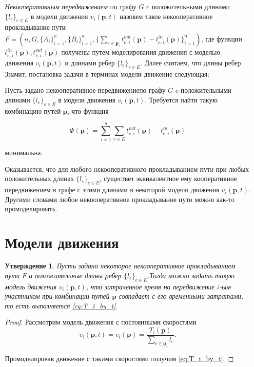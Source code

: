 \documentclass[12pt, a4paper]{article}
\newtheorem{state}{Утверждение}[section]
\begin{document}
\textit{Некооперативным передвижением} по графу $G$ c положительными длинами $\{l_e\}_{e \in E}$ в модели движения $v_i(\textbf{p}, t)$ назовем такое некооперативное прокладывание пути $F = (n, G, \{A_i\}_{i = 1}^{n}, \{B_i\}_{i = 1}^{n}, \{\sum_{e \in \textbf{p}_i} t_{e, i}^{out}(\textbf{p}) - t_{e, i}^{in}(\textbf{p})\}_{i = 1}^{n})$, где функции $t_{e, i}^{in}(\textbf{p}), t_{e, i}^{out}(\textbf{p})$ получены путем моделирования движения с моделью движения $v_i(\textbf{p}, t)$ и длинами ребер $\{l_e\}_{e \in E}$. Далее считаем, что длины ребер 
Значит, постановка задачи в терминах модели движение следующая:

Пусть задано некооперативное передвижениепо графу $G$ c положительными длинами $\{l_e\}_{e \in E}$ в модели движения $v_i(\textbf{p}, t)$.
Требуется найти такую комбинацию путей $\textbf{p}$, что функция 

\begin{equation}
\label{eq:target_task_end}
\Phi(\textbf{p}) =\sum \limits_{i = 1}^n \sum \limits_{e \in E} t_{e, i}^{out}(\textbf{p}) - t_{e, i}^{in}(\textbf{p})
\end{equation}

минимальна.

Оказывается, что для любого некооперативного прокладыванием пути при любых положительных длинах $\{l_e\}_{e \in E}$, существет эквивалентное ему кооперативное передвижением в графе с этими длинами в некоторой модели движения $v_i(\textbf{p}, t)$. Другими словами любое некооперативное прокладывание пути можно как-то промоделировать.

\newpage
\section{Модели движения}

\begin{state}
	\label{state:eqv}
	Пусть задано некоторое некооперативное прокладыванием пути $F$ и положительные длины ребер  $\{l_e\}_{e \in E}$.Тогда можно задать такую модель движения $v_i(\textbf{p}, t)$, что затраченное время на передвижение $i$-ым участником при комбинации путей $\textbf{p}$ совпадает с его временными затратами, то есть выполняется \eqref{eq:T_i_by_t}.
	
\end{state}

\begin{proof}
Рассмотрим модель движения с постоянными скоростями  
$$v_i(\textbf{p}, t) = \overline{v}_i(\textbf{p}) = \frac{T_i (\textbf{p})}{\sum \limits_{e \in \textbf{p}_i} l_e}.$$

Промоделировав движение с такими скоростями получим \eqref{eq:T_i_by_t}.
\end{proof}
\end{document}
